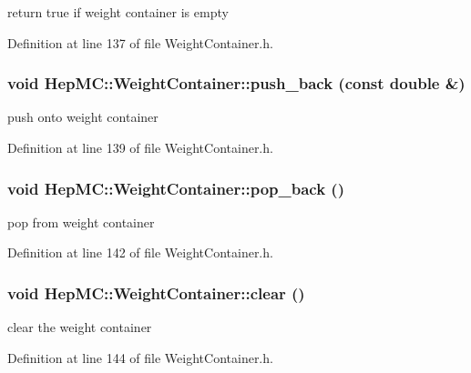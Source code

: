 return true if weight container is empty 



Definition at line 137 of file Weight\-Container.h.
\subsubsection{\setlength{\rightskip}{0pt plus 5cm}void Hep\-MC::Weight\-Container::push\_\-back (const double \&)\hspace{0.3cm}{\tt  [inline]}}\label{classHepMC_1_1WeightContainer_349c9b276cb43c79d762997bc90e8610}


push onto weight container 



Definition at line 139 of file Weight\-Container.h.
\subsubsection{\setlength{\rightskip}{0pt plus 5cm}void Hep\-MC::Weight\-Container::pop\_\-back ()\hspace{0.3cm}{\tt  [inline]}}\label{classHepMC_1_1WeightContainer_3e964159c0ddc4b57d991f243e009f2d}


pop from weight container 



Definition at line 142 of file Weight\-Container.h.
\subsubsection{\setlength{\rightskip}{0pt plus 5cm}void Hep\-MC::Weight\-Container::clear ()\hspace{0.3cm}{\tt  [inline]}}\label{classHepMC_1_1WeightContainer_758271fc6c045729d6018730261d5c3d}


clear the weight container 



Definition at line 144 of file Weight\-Container.h.
